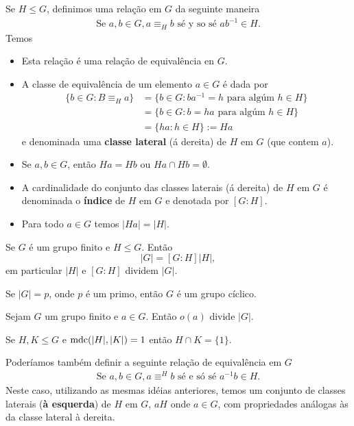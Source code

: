 \begin{definition}
  Se $H\leq G$, definimos uma relação em $G$ da seguinte maneira
  \begin{align*}
    \text{Se }a,b\in G,a\equiv_H b \text{ sé y so sé }ab^{-1}\in H.
  \end{align*}
  Temos
  \begin{itemize}
    \item Esta relação é uma relação de equivalência en $G$.
    \item A classe de equivalência de um elemento $a\in G$ é dada por
      \begin{align*}
        \{b\in G:B\equiv_H a\}&=\{b\in G: ba^{-1}=h\text{ para algúm }h\in H\}\\
        &=\{b\in G: b=ha\text{ para algúm }h\in H\}\\
        &=\{ha:h\in H\}:=Ha
      \end{align*}
      e denominada uma \textbf{classe lateral} (á dereita) de $H$ em $G$ (que contem $a$).
    \item Se $a,b\in G$, então $Ha=Hb$ ou $Ha\cap  Hb=\emptyset$.
    \item A cardinalidade do conjunto das classes laterais (á dereita) de $H$ em $G$ é denominada o \textbf{índice} de $H$ em $G$ e denotada por $[G:H]$.
    \item Para todo $a\in G$ temos $|Ha| = |H|$. 
  \end{itemize}
\end{definition}
\begin{theorem}
  Se $G$ é um grupo finito e $H\leq G$. Então 
  $$|G|=[G:H]|H|,$$
  em particular $|H|$ e $[G:H]$ dividem $|G|$. 
\end{theorem}
\begin{corollary}
  Se $|G|=p$, onde $p$ é um primo, então $G$ é um grupo cíclico. 
\end{corollary}
\begin{corollary}
  Sejam $G$ um grupo finito e $a\in G$. Então $o(a)$ divide $|G|$. 
\end{corollary}
\begin{corollary}
  Se $H,K\leq G$ e $\operatorname{mdc}(|H|,|K|)=1$ então $H\cap K=\{1\}$. 
\end{corollary}
Poderíamos também definir a seguinte relação de equivalência em $G$
\begin{align*}
  \text{Se }a,b\in G, a\equiv^{H} b\text{ sé e só sé }a^{-1}b\in H.
\end{align*}
Neste caso, utilizando as mesmas idéias anteriores, temos um conjunto de classes laterais (\textbf{à esquerda}) de $H$ em $G$, $aH$ onde $a\in G$, com propriedades análogas às da classe lateral à dereita.
